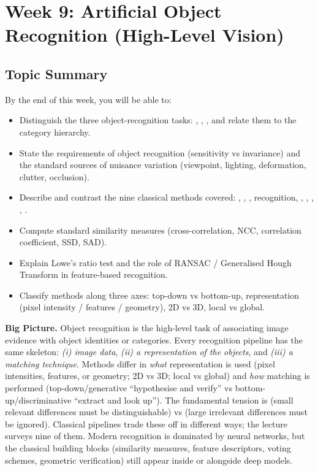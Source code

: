 \section{Week 9: Artificial Object Recognition (High-Level Vision)}

\subsection{Topic Summary}

\begin{keybox}
By the end of this week, you will be able to:
\begin{itemize}
  \item Distinguish the three object-recognition tasks: , , , and relate them to the category hierarchy.
  \item State the requirements of object recognition (sensitivity vs invariance) and the standard sources of nuisance variation (viewpoint, lighting, deformation, clutter, occlusion).
  \item Describe and contrast the nine classical methods covered: , , ,  recognition, , , , , .
  \item Compute standard similarity measures (cross-correlation, NCC, correlation coefficient, SSD, SAD).
  \item Explain Lowe's ratio test and the role of RANSAC / Generalised Hough Transform in feature-based recognition.
  \item Classify methods along three axes: top-down vs bottom-up, representation (pixel intensity / features / geometry), 2D vs 3D, local vs global.
\end{itemize}
\end{keybox}

\textbf{Big Picture.}
Object recognition is the high-level task of associating image evidence with object identities or categories. Every recognition pipeline has the same skeleton: \emph{(i) image data}, \emph{(ii) a representation of the objects}, and \emph{(iii) a matching technique}. Methods differ in \emph{what} representation is used (pixel intensities, features, or geometry; 2D vs 3D; local vs global) and \emph{how} matching is performed (top-down/generative ``hypothesise and verify'' vs bottom-up/discriminative ``extract and look up''). The fundamental tension is  (small relevant differences must be distinguishable) vs  (large irrelevant differences must be ignored). Classical pipelines trade these off in different ways; the lecture surveys nine of them. Modern recognition is dominated by neural networks, but the classical building blocks (similarity measures, feature descriptors, voting schemes, geometric verification) still appear inside or alongside deep models.

